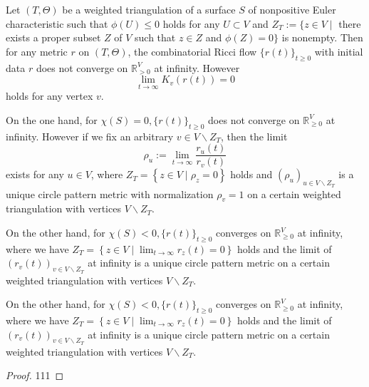 \begin{theorem}\label{Asuka-Takatsu--theorem}
   \leanok
  Let $ (T, \Theta) $ be a weighted triangulation of a surface $ S $ of nonpositive Euler characteristic such that $ \phi(U) \leq 0 $ holds for any $ U \subset V $ and $ Z_{T}:=\{z \in V \mid $ there exists a proper subset $ Z $ of $ V $ such that $ z \in Z $ and $ \phi(Z)=0\} $ is nonempty. Then for any metric $ r $ on $ (T, \Theta) $, the combinatorial Ricci flow $ \{r(t)\}_{t \geq 0} $ with initial data $ r $ does not converge on $ \mathbb{R}_{>0}^{V} $ at infinity. However
  $$
  \lim _{t \rightarrow \infty} K_{v}(r(t))=0
  $$
  holds for any vertex $ v $.

  On the one hand, for $ \chi(S)=0,\{r(t)\}_{t \geq 0} $ does not converge on $ \mathbb{R}_{\geq 0}^{V} $ at infinity. However if we fix an arbitrary $ v \in V \backslash Z_{T} $, then the limit
  $$
  \rho_{u}:=\lim _{t \rightarrow \infty} \frac{r_{u}(t)}{r_{v}(t)}
  $$
  exists for any $ u \in V $, where $ Z_{T}=\left\{z \in V \mid \rho_{z}=0\right\} $ holds and $ \left(\rho_{u}\right)_{u \in V \backslash Z_{T}} $ is a unique circle pattern metric with normalization $ \rho_{v}=1 $ on a certain weighted triangulation with vertices $ V \backslash Z_{T} $.

  On the other hand, for $ \chi(S)<0,\{r(t)\}_{t \geq 0} $ converges on $ \mathbb{R}_{\geq 0}^{V} $ at infinity, where we have $ Z_{T}=\left\{z \in V \mid \lim _{t \rightarrow \infty} r_{z}(t)=0\right\} $ holds and the limit of $ \left(r_{v}(t)\right)_{v \in V \backslash Z_{T}} $ at infinity is a unique circle pattern metric on a certain weighted triangulation with vertices $ V \backslash Z_{T} $.

  On the other hand, for $ \chi(S)<0,\{r(t)\}_{t \geq 0} $ converges on $ \mathbb{R}_{\geq 0}^{V} $ at infinity, where we have $ Z_{T}=\left\{z \in V \mid \lim _{t \rightarrow \infty} r_{z}(t)=0\right\} $ holds and the limit of $ \left(r_{v}(t)\right)_{v \in V \backslash Z_{T}} $ at infinity is a unique circle pattern metric on a certain weighted triangulation with vertices $ V \backslash Z_{T} $.
\end{theorem}

\begin{proof}
  111
\end{proof}
